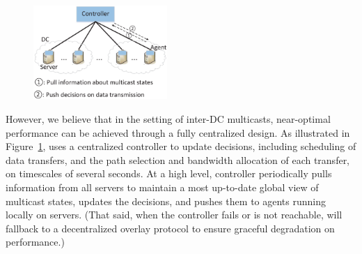 \begin{figure}[t]
  \centering
  \includegraphics[width=2in]{images/framework.eps}
  \label{fig:framework}
\vspace{-0.4cm}
\end{figure}

However, we believe that in the setting of inter-DC
multicasts, near-optimal performance can be achieved
through a fully centralized design.
As illustrated in Figure~\ref{fig:framework},
\name uses a centralized controller to update decisions,
including scheduling of data transfers, and the path selection and
bandwidth allocation of each transfer, on timescales of
several seconds.
At a high level, \name controller periodically pulls information
from all servers to maintain a most up-to-date global view of
multicast states, updates the decisions, and pushes them
to agents running locally on servers.
(That said, when the controller fails or is
not reachable, \name will fallback to a decentralized
overlay protocol to ensure graceful degradation on performance.)

